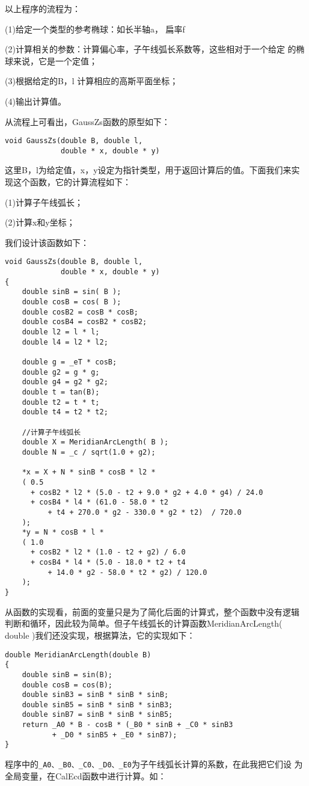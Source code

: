 以上程序的流程为：

(1)给定一个类型的参考椭球：如长半轴a， 扁率f

(2)计算相关的参数：计算偏心率，子午线弧长系数等，这些相对于一个给定
的椭球来说，它是一个定值；

(3)根据给定的B，l 计算相应的高斯平面坐标；

(4)输出计算值。

从流程上可看出，GaussZs函数的原型如下：
\begin{verbatim}
void GaussZs(double B, double l,
             double * x, double * y)
\end{verbatim}
这里B，l为给定值，x，y设定为指针类型，用于返回计算后的值。下面我们来实
现这个函数，它的计算流程如下：

(1)计算子午线弧长；

(2)计算x和y坐标；

我们设计该函数如下：
\begin{verbatim}
void GaussZs(double B, double l,
             double * x, double * y)
{
    double sinB = sin( B );
    double cosB = cos( B );
    double cosB2 = cosB * cosB;
    double cosB4 = cosB2 * cosB2;
    double l2 = l * l;
    double l4 = l2 * l2;

    double g = _eT * cosB;
    double g2 = g * g;
    double g4 = g2 * g2;
    double t = tan(B);
    double t2 = t * t;
    double t4 = t2 * t2;

    //计算子午线弧长
    double X = MeridianArcLength( B );
    double N = _c / sqrt(1.0 + g2);

    *x = X + N * sinB * cosB * l2 *
    ( 0.5
      + cosB2 * l2 * (5.0 - t2 + 9.0 * g2 + 4.0 * g4) / 24.0
      + cosB4 * l4 * (61.0 - 58.0 * t2
          + t4 + 270.0 * g2 - 330.0 * g2 * t2)  / 720.0
    );
    *y = N * cosB * l *
    ( 1.0
      + cosB2 * l2 * (1.0 - t2 + g2) / 6.0
      + cosB4 * l4 * (5.0 - 18.0 * t2 + t4
          + 14.0 * g2 - 58.0 * t2 * g2) / 120.0
    );
}
\end{verbatim}

从函数的实现看，前面的变量只是为了简化后面的计算式，整个函数中没有逻辑
判断和循环，因此较为简单。但子午线弧长的计算函数MeridianArcLength(
double )我们还没实现，根据算法，它的实现如下：
\begin{verbatim}
double MeridianArcLength(double B)
{
    double sinB = sin(B);
    double cosB = cos(B);
    double sinB3 = sinB * sinB * sinB;
    double sinB5 = sinB * sinB * sinB3;
    double sinB7 = sinB * sinB * sinB5;
    return _A0 * B - cosB * (_B0 * sinB + _C0 * sinB3
           + _D0 * sinB5 + _E0 * sinB7);
}
\end{verbatim}
程序中的\verb|_A0、_B0、_C0、_D0、_E0|为子午线弧长计算的系数，在此我把它们设
为全局变量，在CalEcd函数中进行计算。如：

